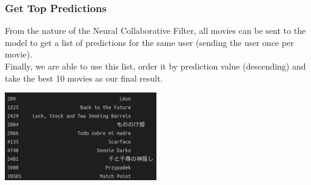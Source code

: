 \subsubsection*{Get Top Predictions}
From the nature of the Neural Collaborative Filter, all movies can be sent to the model to get a list of predictions for the same user (sending the user once per movie).\\
Finally, we are able to use this list, order it by prediction value (descending) and take the best 10 movies as our final result.
\begin{center}
    \captionsetup{type=figure}
    \includegraphics[width=250px]{images/nn-top.png}
\end{center}

